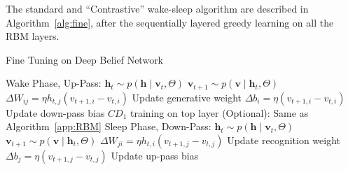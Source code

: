 		The standard and ``Contrastive'' wake-sleep algorithm are described in Algorithm~\ref{alg:fine}, after the sequentially layered greedy learning on all the RBM layers.
		\begin{algorithm}[tdh!]
		\caption{Fine Tuning on Deep Belief Network}
		\label{alg:fine}
			\begin{algorithmic}
			 
			\State Wake Phase, Up-Pass:
					\State $ \mathbf{h}_t \sim p( \mathbf{h} \mid \mathbf{v}_t, \Theta) $
					\State $ \mathbf{v}_{t+1} \sim p( \mathbf{v} \mid \mathbf{h}_{t}, \Theta) $
					\State $ \Delta W_{ij} = \eta h_{t,j} (v_{t+1,i} - v_{t,i}) $
					\Comment Update generative weight
					\State $ \Delta b_{i} = \eta (v_{t+1,i} - v_{t,i}) $
					\Comment Update down-pass bias
				\EndFor
			\State $CD_1$ training on top layer (Optional):
			\Comment Same as Algorithm~\ref{app:RBM}
			\State Sleep Phase, Down-Pass:
					\State $ \mathbf{h}_t \sim p( \mathbf{h} \mid \mathbf{v}_t, \Theta) $
					\State $ \mathbf{v}_{t+1} \sim p( \mathbf{v} \mid \mathbf{h}_{t}, \Theta) $
					\State $ \Delta W_{ji} = \eta h_{t,i} (v_{t+1,j} - v_{t,j}) $
					\Comment Update recognition weight
					\State $ \Delta b_{j} = \eta (v_{t+1,j} - v_{t,j}) $
					\Comment Update up-pass bias
				\EndFor			
			
			\EndFor
			\end{algorithmic}
		\end{algorithm}				
		
